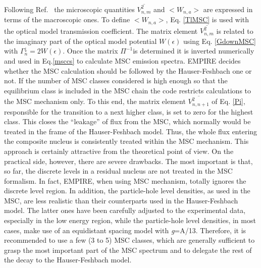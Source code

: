 \documentclass[twocolumn,amsmath,amssymb,10pt,groupedaddress,letter]{revtex4}
\begin{document}
Following Ref.~\cite{HRW} the microscopic quantities $\overline{V_{n,m}^{2}}$
and $<W_{n,a}>$ are expressed in terms of the macroscopic
ones. To define $<W_{n,a}>$,  Eq. \ref{TlMSC} is used with
 the optical model transmission coefficient. The matrix element
$\overline{V_{n,m}^{2}}$ is related to the imaginary part of the
optical model potential $W(\epsilon)$ using Eq. \ref{GdownMSC} with
$\Gamma_{n}^{\downarrow}=2W(\epsilon)$. Once the matrix $\Pi^{-1}$is determined it
is inverted numerically and used in Eq.\ref{msccs} to calculate MSC
emission spectra.
EMPIRE decides whether the MSC calculation should be followed by the
Hauser-Feshbach one or not. If the number
of MSC classes considered is high enough so that the equilibrium class
is included in the MSC chain the code restricts calculations to the
MSC mechanism only. To this end, the matrix element $\overline{V_{n,n+1}^{2}}$
of Eq. \ref{Pi}, responsible for the transition to a next higher
class, is set to zero for the highest class. This closes the {}``leakage''
of flux from the MSC, which normally would be treated in the frame
of the Hauser-Feshbach model. Thus, the whole
flux entering the composite nucleus is consistently treated within
the MSC mechanism. This approach is certainly attractive from the
theoretical point of view. On the practical side, however, there are
severe drawbacks. The most important is that, so far, the discrete
levels in a residual nucleus are not treated in the MSC
formalism. In fact, EMPIRE, when using MSC mechanism, totally ignores
the discrete level region. In addition, the particle-hole level densities,
as used in the MSC, are less realistic than their counterparts used
in the Hauser-Feshbach model. The latter ones
have been carefully adjusted to the experimental data, especially
in the low energy region, while the particle-hole level densities,
in most cases, make use of an equidistant spacing model with \emph{g}=A/13.
Therefore, it is recommended to use a few (3 to 5) MSC
classes, which are generally sufficient to grasp the most important
part of the MSC spectrum and to delegate the rest of the decay to
the Hauser-Feshbach model.

\medskip
\end{document}
